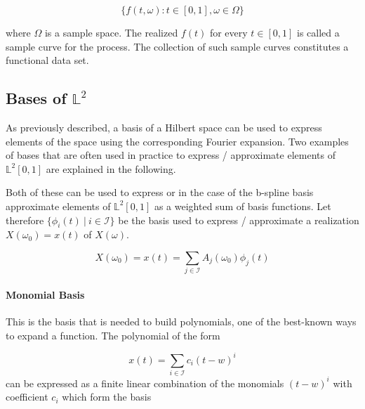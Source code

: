 \documentclass[11pt,twoside,a4paper]{article}
\begin{document}
	
	\begin{equation}
	\{f(t,\omega) : t \in [0, 1], \omega \in \Omega\}
	\end{equation}
	
	where $\Omega$ is a sample space. The realized $f(t)$ for every $t \in [0,1]$ is called a sample curve for the process. The collection of such sample curves constitutes a functional data set.
	
	\subsection{Bases of $\mathbb{L}^2$} %
	As previously described, a basis of a Hilbert space can be used to express elements of the space using the corresponding Fourier expansion. Two examples of bases that are often used in practice to express / approximate elements of $\mathbb{L}^2[0,1]$  are explained in the following.
	
	Both of these can be used to express or in the case of the b-spline basis approximate elements of $\mathbb{L}^2[0,1]$ as a weighted sum of basis functions. Let therefore $\{\phi_i(t) \: \vert \: i \in \mathcal{I}\}$ be the basis used to express / approximate a realization $X(\omega_0) = x(t)$ of $X(\omega)$.
	
	\begin{equation}
		X(\omega_0) = x(t) = \sum_{j \in \mathcal{I}} A_{j}(\omega_0) \phi_j(t)
	\end{equation}
	
	\paragraph{Monomial Basis}
This is the basis that is needed to build polynomials, one of the best-known ways to expand a function.
The polynomial of the form 

	\begin{equation}
		x(t) = \sum_{i \in \mathcal{I}} c_i(t -w)^{i}
	\end{equation}
	can be expressed as a finite linear combination of the monomials $(t - w)^{i}$ with coefficient $c_i$ which form the basis 
	
\end{document}
